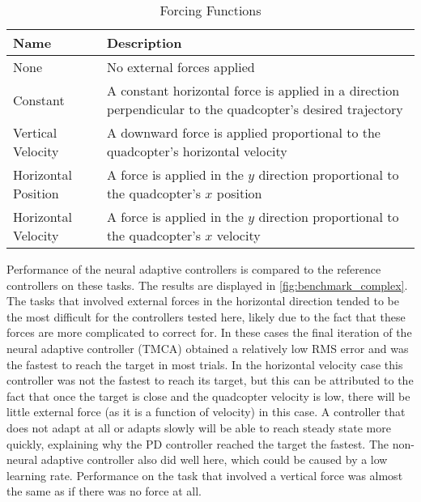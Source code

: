 \documentclass[letterpaper,12pt,titlepage,oneside,final]{book}
\begin{document}
\begin{table}
\caption{Forcing Functions} \label{table:forcingfunctions}
\begin{center}
\begin{tabular}{| l | p{9cm} |}
\hline
\textbf{Name} & \textbf{Description} \\ \hline
None & No external forces applied \\ \hline
Constant & A constant horizontal force is applied in a direction perpendicular to the quadcopter's desired trajectory\\ \hline
Vertical Velocity & A downward force is applied proportional to the quadcopter's horizontal velocity \\ \hline
Horizontal Position & A force is applied in the $y$ direction proportional to the quadcopter's $x$ position \\ \hline
Horizontal Velocity & A force is applied in the $y$ direction proportional to the quadcopter's $x$ velocity \\ \hline
\end{tabular}
\end{center}
\end{table}

Performance of the neural adaptive controllers is compared to the reference controllers on these tasks.
The results are displayed in \autoref{fig:benchmark_complex}.
The tasks that involved external forces in the horizontal direction tended to be the most difficult for the controllers tested here, likely due to the fact that these forces are more complicated to correct for.
In these cases the final iteration of the neural adaptive controller (TMCA) obtained a relatively low RMS error and was the fastest to reach the target in most trials.
In the horizontal velocity case this controller was not the fastest to reach its target, but this can be attributed to the fact that once the target is close and the quadcopter velocity is low, there will be little external force (as it is a function of velocity) in this case. 
A controller that does not adapt at all or adapts slowly will be able to reach steady state more quickly, explaining why the PD controller reached the target the fastest.
The non-neural adaptive controller also did well here, which could be caused by a low learning rate.
Performance on the task that involved a vertical force was almost the same as if there was no force at all. 
\end{document}
